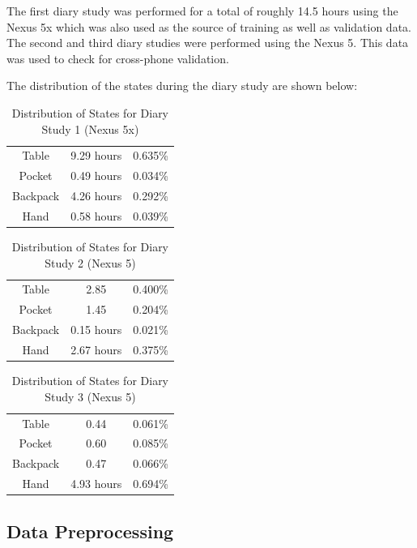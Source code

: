 The first diary study was performed for a total of roughly 14.5 hours using the Nexus 5x which was also used as the source of training as well as validation data.
The second and third diary studies were performed using the Nexus 5.
This data was used to check for cross-phone validation.


The distribution of the states during the diary study are shown below:


\begin{table}[h]
\caption{Distribution of States for Diary Study 1 (Nexus 5x)}\label{tab:diary1} \centering
\begin{tabular}{ |c|c|c| } 
 \hline
 Table & 9.29 hours & 0.635\%  \\ 
 Pocket & 0.49 hours & 0.034\% \\ 
 Backpack &  4.26 hours  &  0.292\% \\ 
 Hand & 0.58 hours  & 0.039\% \\
 \hline
\end{tabular}
\end{table}

\begin{table}[h]
\caption{Distribution of States for Diary Study 2 (Nexus 5)}\label{tab:diary1} \centering
\begin{tabular}{ |c|c|c| } 
 \hline
 Table & 2.85 & 0.400\%  \\ 
 Pocket & 1.45 & 0.204\% \\ 
 Backpack &  0.15 hours  &  0.021\% \\ 
 Hand & 2.67 hours  & 0.375\% \\
 \hline
\end{tabular}
\end{table}

\begin{table}[h]
\caption{Distribution of States for Diary Study 3 (Nexus 5)}\label{tab:diary1} \centering
\begin{tabular}{ |c|c|c| } 
 \hline
 Table & 0.44 & 0.061\%  \\ 
 Pocket & 0.60 & 0.085\% \\ 
 Backpack &  0.47  &  0.066\% \\ 
 Hand & 4.93 hours  & 0.694\% \\
 \hline
\end{tabular}
\end{table}

\subsection{Data Preprocessing}

